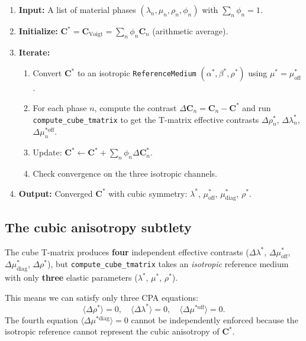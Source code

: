 \documentclass[11pt,a4paper]{article}
\newcommand{\D}{\Delta}
\newcommand{\bC}{\bm{C}}
\begin{document}
\begin{enumerate}
  \item \textbf{Input:} A list of material phases
    $(\lambda_n, \mu_n, \rho_n, \phi_n)$ with $\sum_n \phi_n = 1$.
  \item \textbf{Initialize:} $\bC^* = \bC_{\text{Voigt}}
    = \sum_n \phi_n \bC_n$ (arithmetic average).
  \item \textbf{Iterate:}
    \begin{enumerate}[label=(\alph*)]
      \item Convert $\bC^*$ to an isotropic \texttt{ReferenceMedium}
        $(\alpha^*, \beta^*, \rho^*)$ using $\mu^* = \mu^*_{\text{off}}$.
      \item For each phase $n$, compute the contrast
        $\D\bC_n = \bC_n - \bC^*$ and run
        \texttt{compute\_cube\_tmatrix} to get the T-matrix effective
        contrasts $\D\rho^*_n$, $\D\lambda^*_n$, $\D\mu^{*\text{off}}_n$.
      \item Update: $\bC^* \leftarrow \bC^* + \sum_n \phi_n \D\bC^*_n$.
      \item Check convergence on the three isotropic channels.
    \end{enumerate}
  \item \textbf{Output:} Converged $\bC^*$ with cubic symmetry:
    $\lambda^*$, $\mu^*_{\text{off}}$, $\mu^*_{\text{diag}}$, $\rho^*$.
\end{enumerate}

\subsection{The cubic anisotropy subtlety}

The cube T-matrix produces \textbf{four} independent effective
contrasts ($\D\lambda^*$, $\D\mu^*_{\text{off}}$,
$\D\mu^*_{\text{diag}}$, $\D\rho^*$), but \texttt{compute\_cube\_tmatrix}
takes an \emph{isotropic} reference medium with only
\textbf{three} elastic parameters ($\lambda^*$, $\mu^*$, $\rho^*$).

This means we can satisfy only three CPA equations:
\begin{equation}
  \langle \D\rho^* \rangle = 0, \quad
  \langle \D\lambda^* \rangle = 0, \quad
  \langle \D\mu^{*\text{off}} \rangle = 0.
\end{equation}
The fourth equation $\langle \D\mu^{*\text{diag}} \rangle = 0$
cannot be independently enforced because the isotropic reference
cannot represent the cubic anisotropy of $\bC^*$.
\end{document}
